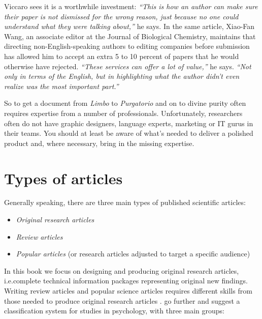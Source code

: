 \documentclass[graybox,envcountchap,sectrefs,UStrade]{svmono}
\begin{document}
Viccaro sees it is a worthwhile investment: \emph{``This is how an author can make sure their paper is not dismissed for the wrong reason, just because no one could understand what they were talking about,''} he says. In the same article, Xiao-Fan Wang, an associate editor at the Journal of Biological Chemistry, maintains that directing non-English-speaking authors to editing companies before submission has allowed him to accept an extra 5 to 10 percent of papers that he would otherwise have rejected. \emph{``These services can offer a lot of value,''} he says. \emph{``Not only in terms of the English, but in highlighting what the author didn't even realize was the most important part.''}\par

So to get a document from \emph{Limbo} to \emph{Purgatorio} and on to divine purity often requires expertise from a number of professionals. Unfortunately, researchers often do not have graphic designers, language experts, marketing or IT gurus in their teams. You should at least be aware of what's needed to deliver a polished product and, where necessary, bring in the missing expertise.\par


\section{Types of articles}

Generally speaking, there are three main types of published scientific articles:

\begin{itemize}
  \item \emph{Original research articles}
  \item \emph{Review articles}
  \item \emph{Popular articles} (or research articles adjusted to target a specific audience)
\end{itemize}

In this book we focus on designing and producing original research articles, i.e.\@ complete technical information packages representing original new findings. Writing review articles and popular science articles requires different skills from those needed to produce original research articles \citep{turabian2007manual}. \citet{MonteroLeon2007} go further and suggest a classification system for studies in psychology, with three main groups:
\end{document}
